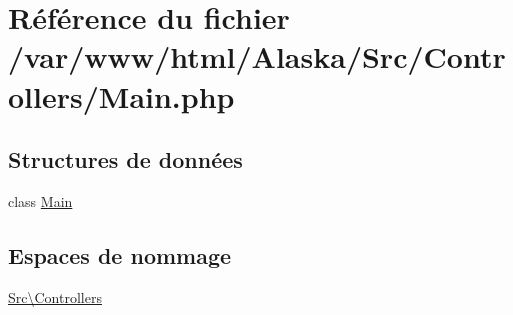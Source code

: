 \hypertarget{_main_8php}{}\section{Référence du fichier /var/www/html/\+Alaska/\+Src/\+Controllers/\+Main.php}
\label{_main_8php}
\subsection*{Structures de données}
\begin{DoxyCompactItemize}
\item 
class \hyperlink{class_src_1_1_controllers_1_1_main}{Main}
\end{DoxyCompactItemize}
\subsection*{Espaces de nommage}
\begin{DoxyCompactItemize}
\item 
 \hyperlink{namespace_src_1_1_controllers}{Src\textbackslash{}\+Controllers}
\end{DoxyCompactItemize}
